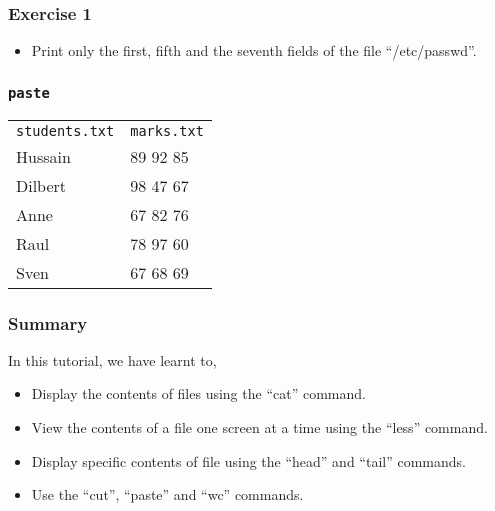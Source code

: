 \documentclass[12pt,compress]{beamer}
\begin{document}
\begin{frame}
  \frametitle{Exercise 1}
  \begin{itemize}
  \item Print only the first, fifth and the seventh fields of the file ``/etc/passwd''.
  \end{itemize}
\end{frame}

\begin{frame}[fragile]
  \frametitle{\texttt{paste}}
      \begin{center}
      \begin{tabular}{l|l}
        \verb~students.txt~  &  \verb~marks.txt~  \\
        Hussain              &  89 92 85          \\
        Dilbert              &  98 47 67          \\
        Anne                 &  67 82 76          \\
        Raul                 &  78 97 60          \\
        Sven                 &  67 68 69          \\
      \end{tabular}
    \end{center}
\end{frame}

\begin{frame}
\frametitle{Summary}
\label{sec-8}

  In this tutorial, we have learnt to,


\begin{itemize}
\item Display the contents of files using the ``cat'' command.
\item View the contents of a file one screen at a time using the 
      ``less'' command.
\item Display specific contents of file using the ``head'' and 
      ``tail'' commands.
\item Use the ``cut'', ``paste'' and ``wc'' commands.
\end{itemize}
\end{frame}
\end{document}
